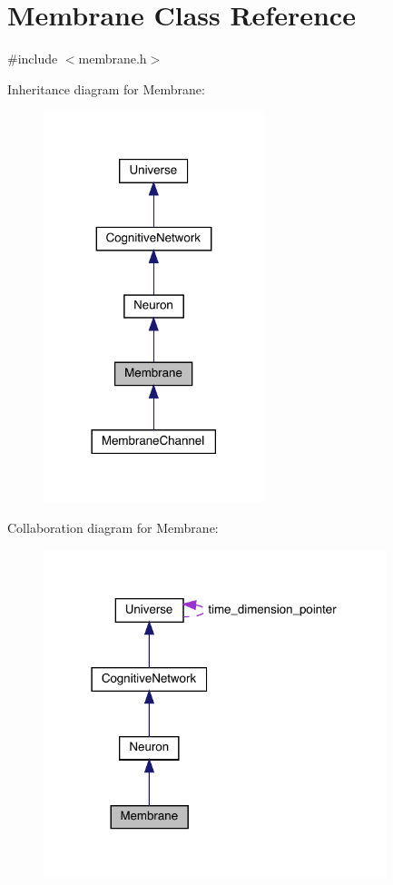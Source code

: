 \hypertarget{class_membrane}{}\section{Membrane Class Reference}
\label{class_membrane}


{\ttfamily \#include $<$membrane.\+h$>$}



Inheritance diagram for Membrane\+:\nopagebreak
\begin{figure}[H]
\begin{center}
\leavevmode
\includegraphics[width=182pt]{class_membrane__inherit__graph}
\end{center}
\end{figure}


Collaboration diagram for Membrane\+:\nopagebreak
\begin{figure}[H]
\begin{center}
\leavevmode
\includegraphics[width=283pt]{class_membrane__coll__graph}
\end{center}
\end{figure}
